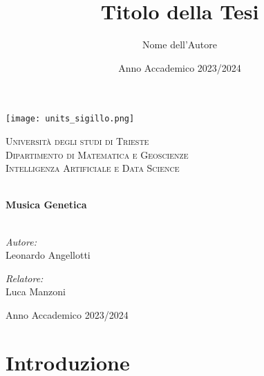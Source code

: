 \documentclass[a4paper,12pt]{report}
\title{Titolo della Tesi}
\author{Nome dell'Autore}
\date{Anno Accademico 2023/2024}
\begin{document}
\begin{titlepage}
    \begin{center}
        \texttt{[image: units\_sigillo.png]} 
        \vspace{1cm}
        
        \textsc{\LARGE Università degli studi di Trieste}\\[1.5cm]
        
        \textsc{\Large Dipartimento di Matematica e Geoscienze}\\[0.5cm]
        
        \textsc{\large Intelligenza Artificiale e Data Science}\\[0.5cm]
        
        \vspace{2cm}
        
        \HRule \\[0.4cm]
        { \huge \bfseries Musica Genetica \\[0.4cm] }
        \HRule \\[1.5cm]
        
        \vspace{2cm}
        
        \begin{minipage}{0.4\textwidth}
            \begin{flushleft} \large
                \emph{Autore:}\\
                Leonardo Angellotti
            \end{flushleft}
        \end{minipage}
        \begin{minipage}{0.4\textwidth}
            \begin{flushright} \large
                \emph{Relatore:} \\
                Luca Manzoni
            \end{flushright}
        \end{minipage}
        
        \vfill
        
        {\large Anno Accademico 2023/2024}
        
    \end{center}
\end{titlepage}

\tableofcontents

\chapter{Introduzione}
\end{document}
